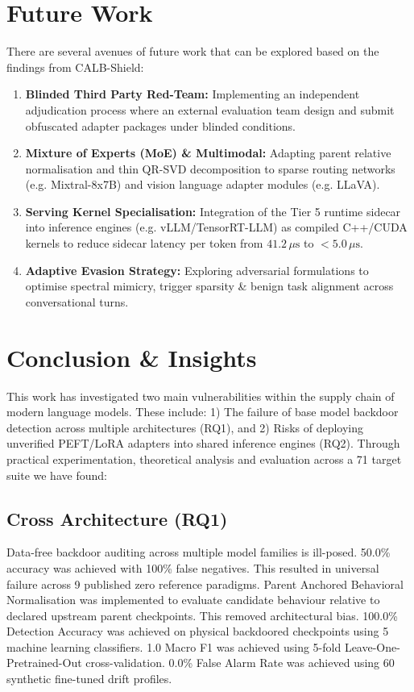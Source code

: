 \section{Future Work}
\label{sec:future_work}

There are several avenues of future work that can be explored based on the findings from CALB-Shield:
\begin{enumerate}
    \item \textbf{Blinded Third Party Red-Team:} Implementing an independent adjudication process where an external evaluation team design and submit obfuscated adapter packages under blinded conditions.
    \item \textbf{Mixture of Experts (MoE) \& Multimodal:} Adapting parent relative normalisation and thin QR-SVD decomposition to sparse routing networks (e.g. Mixtral-8x7B) and vision language adapter modules (e.g. LLaVA).
    \item \textbf{Serving Kernel Specialisation:} Integration of the Tier 5 runtime sidecar into inference engines (e.g. vLLM/TensorRT-LLM) as compiled C++/CUDA kernels to reduce sidecar latency per token from $41.2\,\mu\text{s}$ to $< 5.0\,\mu\text{s}$.
    \item \textbf{Adaptive Evasion Strategy:} Exploring adversarial formulations to optimise spectral mimicry, trigger sparsity \& benign task alignment across conversational turns.
\end{enumerate}

\section{Conclusion \& Insights}
\label{sec:conclusion}

This work has investigated two main vulnerabilities within the supply chain of modern language models. These include: 1) The failure of base model backdoor detection across multiple architectures (RQ1), and 2) Risks of deploying unverified PEFT/LoRA adapters into shared inference engines (RQ2). Through practical experimentation, theoretical analysis and evaluation across a 71 target suite we have found:

\subsection{Cross Architecture (RQ1)}
Data-free backdoor auditing across multiple model families is ill-posed. 50.0\% accuracy was achieved with 100\% false negatives. This resulted in universal failure across 9 published zero reference paradigms. Parent Anchored Behavioral Normalisation was implemented to evaluate candidate behaviour relative to declared upstream parent checkpoints. This removed architectural bias. 100.0\% Detection Accuracy was achieved on physical backdoored checkpoints using 5 machine learning classifiers. 1.0 Macro F1 was achieved using 5-fold Leave-One-Pretrained-Out cross-validation. 0.0\% False Alarm Rate was achieved using 60 synthetic fine-tuned drift profiles.

